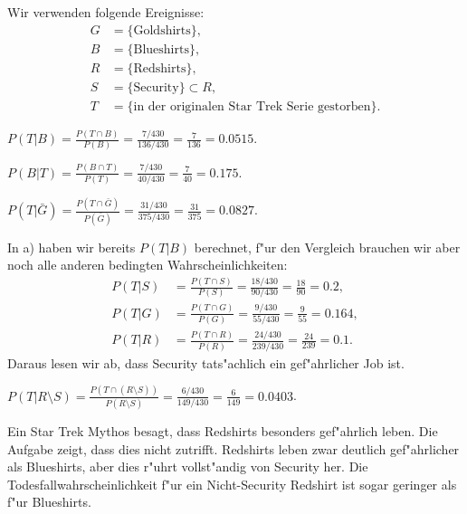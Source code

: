 \begin{loesung}
Wir verwenden folgende Ereignisse:
\begin{align*}
G&=\{\text{Goldshirts}\},\\
B&=\{\text{Blueshirts}\},\\
R&=\{\text{Redshirts}\},\\
S&=\{\text{Security}\}\subset R,\\
T&=\{\text{in der originalen Star Trek Serie gestorben}\}.
\end{align*}
\begin{teilaufgaben}
\item
$
\displaystyle
P(T|B)
=
\frac{P(T\cap B)}{P(B)}
=
\frac{7/430}{136/430}
=
\frac{7}{136}
=0.0515.
$
\item
$
\displaystyle
P(B|T)
=
\frac{P(B\cap T)}{P(T)}
=
\frac{7/430}{40/430}
=
\frac{7}{40}
=0.175.
$
\item
$
\displaystyle
P(T|\bar G)
=
\frac{P(T\cap\bar G)}{P(\bar G)}
=
\frac{31/430}{375/430}
=
\frac{31}{375}
=0.0827.
$
\item
In a) haben wir bereits $P(T|B)$ berechnet, f"ur den Vergleich
brauchen wir aber noch alle anderen bedingten Wahrscheinlichkeiten:
\begin{align*}
P(T|S)&
=\frac{P(T\cap S)}{P(S)}
=\frac{18/430}{90/430}
=\frac{18}{90}
=0.2,
\\
P(T|G)&
=\frac{P(T\cap G)}{P(G)}
=\frac{9/430}{55/430}
=\frac{9}{55}
=0.164,
\\
P(T|R)&
=\frac{P(T\cap R)}{P(R)}
=\frac{24/430}{239/430}
=\frac{24}{239}
=0.1.
\end{align*}
Daraus lesen wir ab, dass Security tats"achlich ein gef"ahrlicher
Job ist.
\item
$
\displaystyle
P(T|R\setminus S)
=\frac{P(T\cap(R\setminus S))}{P(R\setminus S)}
=\frac{6/430}{149/430}
=\frac{6}{149}
=0.0403$.
\qedhere
\end{teilaufgaben}
\end{loesung}

\begin{diskussion}
Ein Star Trek Mythos besagt, dass Redshirts besonders gef"ahrlich
leben. Die Aufgabe zeigt, dass dies nicht zutrifft.
Redshirts leben zwar deutlich gef"ahrlicher als Blueshirts, aber
dies r"uhrt vollst"andig von Security her. Die Todesfallwahrscheinlichkeit
f"ur ein Nicht-Security Redshirt ist sogar geringer als f"ur Blueshirts.
\end{diskussion}


